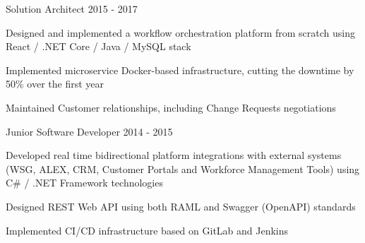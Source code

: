\begin{cventries}
  \cventry
    {Solution Architect} %
    {} %
    {} %
    {} %
    {2015 - 2017} %
    {
      \begin{cvitems} %
        \item {Designed and implemented a workflow orchestration platform from scratch using React / .NET Core / Java / MySQL stack}
        \item {Implemented microservice Docker-based infrastructure, cutting the downtime by 50\% over the first year}
        \item {Maintained Customer relationships, including Change Requests negotiations}
      \end{cvitems}
    }

  \cventry
    {Junior Software Developer} %
    {} %
    {} %
    {} %
    {2014 - 2015} %
    {
      \begin{cvitems} %
        \item {Developed real time bidirectional platform integrations with external systems (WSG, ALEX, CRM, Customer Portals and Workforce Management Tools) using C\# / .NET Framework technologies}
        \item {Designed REST Web API using both RAML and Swagger (OpenAPI) standards}
        \item {Implemented CI/CD infrastructure based on GitLab and Jenkins}
      \end{cvitems}
    }

\end{cventries}
